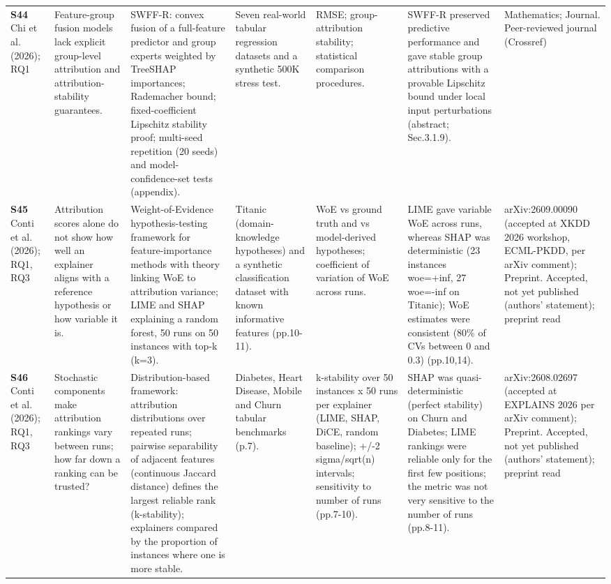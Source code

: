 \begin{longtable}{@{}P{1.55cm}P{2.9cm}P{4.5cm}P{3.2cm}P{3.4cm}P{4.6cm}P{3.6cm}@{}}
\textbf{S44} \cite{S44} Chi et al. (2026); RQ1 & Feature-group fusion models lack explicit group-level attribution and attribution-stability guarantees. & SWFF-R: convex fusion of a full-feature predictor and group experts weighted by TreeSHAP importances; Rademacher bound; fixed-coefficient Lipschitz stability proof; multi-seed repetition (20 seeds) and model-confidence-set tests (appendix). & Seven real-world tabular regression datasets and a synthetic 500K stress test. & RMSE; group-attribution stability; statistical comparison procedures. & SWFF-R preserved predictive performance and gave stable group attributions with a provable Lipschitz bound under local input perturbations (abstract; Sec.3.1.9). & Mathematics; Journal. Peer-reviewed journal (Crossref) \\
\textbf{S45} \cite{S45} Conti et al. (2026); RQ1, RQ3 & Attribution scores alone do not show how well an explainer aligns with a reference hypothesis or how variable it is. & Weight-of-Evidence hypothesis-testing framework for feature-importance methods with theory linking WoE to attribution variance; LIME and SHAP explaining a random forest, 50 runs on 50 instances with top-k (k=3). & Titanic (domain-knowledge hypotheses) and a synthetic classification dataset with known informative features (pp.10-11). & WoE vs ground truth and vs model-derived hypotheses; coefficient of variation of WoE across runs. & LIME gave variable WoE across runs, whereas SHAP was deterministic (23 instances woe=+inf, 27 woe=-inf on Titanic); WoE estimates were consistent (80\% of CVs between 0 and 0.3) (pp.10,14). & arXiv:2609.00090 (accepted at XKDD 2026 workshop, ECML-PKDD, per arXiv comment); Preprint. Accepted, not yet published (authors' statement); preprint read \\
\textbf{S46} \cite{S46} Conti et al. (2026); RQ1, RQ3 & Stochastic components make attribution rankings vary between runs; how far down a ranking can be trusted? & Distribution-based framework: attribution distributions over repeated runs; pairwise separability of adjacent features (continuous Jaccard distance) defines the largest reliable rank (k-stability); explainers compared by the proportion of instances where one is more stable. & Diabetes, Heart Disease, Mobile and Churn tabular benchmarks (p.7). & k-stability over 50 instances x 50 runs per explainer (LIME, SHAP, DiCE, random baseline); +/\allowbreak{}-2 sigma/\allowbreak{}sqrt(n) intervals; sensitivity to number of runs (pp.7-10). & SHAP was quasi-deterministic (perfect stability) on Churn and Diabetes; LIME rankings were reliable only for the first few positions; the metric was not very sensitive to the number of runs (pp.8-11). & arXiv:2608.02697 (accepted at EXPLAINS 2026 per arXiv comment); Preprint. Accepted, not yet published (authors' statement); preprint read \\

\end{longtable}
